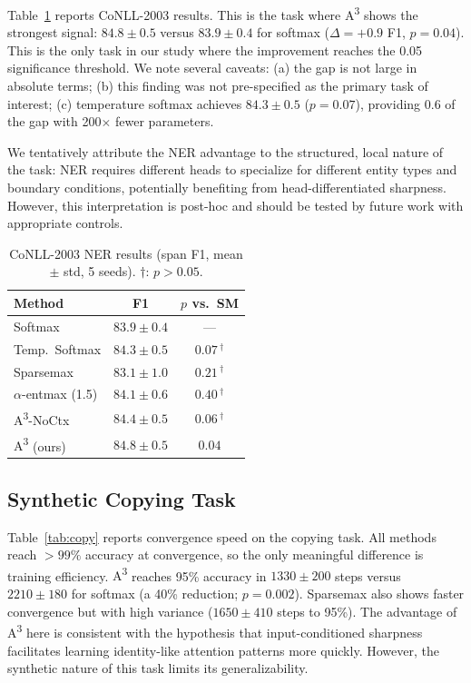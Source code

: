 \documentclass[11pt]{article}
\newcommand{\AAA}{\textsc{A\textsuperscript{3}}}
\newcommand{\warn}[1]{\textcolor{warncolor}{#1}}
\begin{document}
Table~\ref{tab:ner} reports CoNLL-2003 results. This is the task where \AAA{} shows the strongest signal: $84.8 \pm 0.5$ versus $83.9 \pm 0.4$ for softmax ($\Delta = +0.9$ F1, $p = 0.04$). This is the only task in our study where the improvement reaches the 0.05 significance threshold. We note several caveats: (a) the gap is not large in absolute terms; (b) this finding was not pre-specified as the primary task of interest; (c) temperature softmax achieves $84.3 \pm 0.5$ ($p = 0.07$), providing 0.6 of the gap with 200$\times$ fewer parameters.

We tentatively attribute the NER advantage to the structured, local nature of the task: NER requires different heads to specialize for different entity types and boundary conditions, potentially benefiting from head-differentiated sharpness. However, this interpretation is post-hoc and should be tested by future work with appropriate controls.

\begin{table}[H]
\centering
\caption{CoNLL-2003 NER results (span F1, mean $\pm$ std, 5 seeds). \warn{$\dagger$}: $p > 0.05$.}
\label{tab:ner}
\begin{tabular}{lcc}
\toprule
\textbf{Method} & \textbf{F1} & \textbf{$p$ vs.\ SM} \\
\midrule
Softmax             & $83.9 \pm 0.4$ & --- \\
Temp.\ Softmax      & $84.3 \pm 0.5$ & \warn{$0.07\,^\dagger$} \\
Sparsemax           & $83.1 \pm 1.0$ & \warn{$0.21\,^\dagger$} \\
$\alpha$-entmax (1.5) & $84.1 \pm 0.6$ & \warn{$0.40\,^\dagger$} \\
\AAA{}-NoCtx        & $84.4 \pm 0.5$ & \warn{$0.06\,^\dagger$} \\
\AAA{} (ours)       & $84.8 \pm 0.5$ & $0.04$ \\
\bottomrule
\end{tabular}
\end{table}

\subsection{Synthetic Copying Task}

Table~\ref{tab:copy} reports convergence speed on the copying task. All methods reach $>99\%$ accuracy at convergence, so the only meaningful difference is training efficiency. \AAA{} reaches 95\% accuracy in $1330 \pm 200$ steps versus $2210 \pm 180$ for softmax (a 40\% reduction; $p = 0.002$). Sparsemax also shows faster convergence but with high variance ($1650 \pm 410$ steps to 95\%). The advantage of \AAA{} here is consistent with the hypothesis that input-conditioned sharpness facilitates learning identity-like attention patterns more quickly. However, the synthetic nature of this task limits its generalizability.
\end{document}

